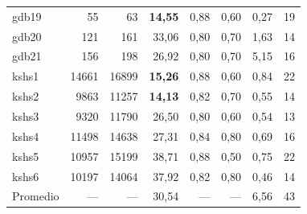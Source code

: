\begin{table}[htbp]
\begin{tabular}{l r r r r r r r}
    gdb19  &   55 &   63 & \textbf{14{,}55} & 0{,}88 & 0{,}60 &  0{,}27 &  19 \\
    gdb20  &  121 &  161 &        33{,}06 & 0{,}80 & 0{,}70 &  1{,}63 &  14 \\
    gdb21  &  156 &  198 &        26{,}92 & 0{,}80 & 0{,}70 &  5{,}15 &  16 \\
    kshs1  & 14661 & 16899 & \textbf{15{,}26} & 0{,}88 & 0{,}60 &  0{,}84 &  22 \\
    kshs2  &  9863 & 11257 & \textbf{14{,}13} & 0{,}82 & 0{,}70 &  0{,}55 &  14 \\
    kshs3  &  9320 & 11790 &        26{,}50 & 0{,}80 & 0{,}60 &  0{,}54 &  13 \\
    kshs4  & 11498 & 14638 &        27{,}31 & 0{,}84 & 0{,}80 &  0{,}69 &  16 \\
    kshs5  & 10957 & 15199 &        38{,}71 & 0{,}88 & 0{,}50 &  0{,}75 &  22 \\
    kshs6  & 10197 & 14064 &        37{,}92 & 0{,}82 & 0{,}80 &  0{,}46 &  14 \\
    \midrule
    Promedio & --- & --- & 30{,}54 & --- & --- & 6{,}56 & 43 \\
    \bottomrule
  \end{tabular}
\end{table}
